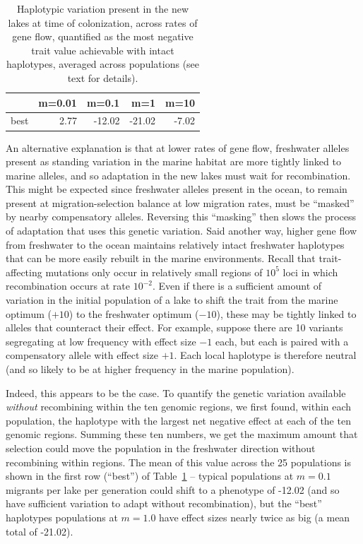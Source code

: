 \documentclass{article}
\begin{document}
\begin{table}[ht]
    \centering
    \begin{tabular}{rrrrr}
      \hline
     & m=0.01 & m=0.1 & m=1 & m=10 \\ 
      \hline
          best & 2.77 & -12.02 & -21.02 & -7.02 \\ 
       \hline
    \end{tabular}
    \caption{
        Haplotypic variation present in the new lakes at time of colonization,
        across rates of gene flow,
        quantified as the most negative trait value achievable
            with intact haplotypes, averaged across populations
            (see text for details).
    } \label{tab:linkage}
\end{table}

An alternative explanation is that at lower rates of gene flow,
freshwater alleles present as standing variation in the marine habitat
are more tightly linked to marine alleles,
and so adaptation in the new lakes must wait for recombination.
This might be expected since freshwater alleles present in the ocean,
to remain present at migration-selection balance at low migration rates,
must be ``masked'' by nearby compensatory alleles.
Reversing this ``masking'' then slows the process of adaptation that uses this genetic variation.
Said another way,
higher gene flow from freshwater to the ocean
maintains relatively intact freshwater haplotypes
that can be more easily rebuilt in the marine environments.
Recall that trait-affecting mutations only occur in relatively small regions of $10^5$ loci
in which recombination occurs at rate $10^{-2}$.
Even if there is a sufficient amount of variation in the initial population of a lake
to shift the trait from the marine optimum ($+10$) to the freshwater optimum ($-10$),
these may be tightly linked to alleles that counteract their effect.
For example, suppose there are 10 variants segregating at low frequency with effect size $-1$ each,
but each is paired with a compensatory allele with effect size $+1$.
Each local haplotype is therefore neutral
(and so likely to be at higher frequency in the marine population).

Indeed, this appears to be the case.
To quantify the genetic variation available \emph{without} recombining within the ten genomic regions,
we first found, within each population, the haplotype with the largest net negative effect
at each of the ten genomic regions.
Summing these ten numbers, 
we get the maximum amount that selection could move the population in the freshwater direction
without recombining within regions.
The mean of this value across the 25 populations is shown 
in the first row (``best'') of Table~\ref{tab:linkage} --
typical populations at $m=0.1$ migrants per lake per generation could shift to a phenotype of -12.02
(and so have sufficient variation to adapt without recombination),
but the ``best'' haplotypes populations at $m=1.0$ have effect sizes nearly twice as big 
(a mean total of -21.02).
\end{document}
